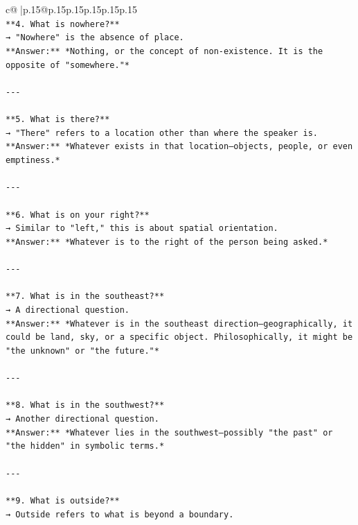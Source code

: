 \documentclass{article}
\begin{document}
{\begin{supertabular}{c@{$\;$}|p{.15\linewidth}@{}p{.15\linewidth}p{.15\linewidth}p{.15\linewidth}p{.15\linewidth}p{.15\linewidth}}
{{{\\ 
\texttt{**4. What is nowhere?**  } \\
\texttt{→ "Nowhere" is the absence of place.  } \\
\texttt{**Answer:** *Nothing, or the concept of non{-}existence. It is the opposite of "somewhere."*} \\
\\ 
\texttt{{-}{-}{-}} \\
\\ 
\texttt{**5. What is there?**  } \\
\texttt{→ "There" refers to a location other than where the speaker is.  } \\
\texttt{**Answer:** *Whatever exists in that location—objects, people, or even emptiness.*} \\
\\ 
\texttt{{-}{-}{-}} \\
\\ 
\texttt{**6. What is on your right?**  } \\
\texttt{→ Similar to "left," this is about spatial orientation.  } \\
\texttt{**Answer:** *Whatever is to the right of the person being asked.*} \\
\\ 
\texttt{{-}{-}{-}} \\
\\ 
\texttt{**7. What is in the southeast?**  } \\
\texttt{→ A directional question.  } \\
\texttt{**Answer:** *Whatever is in the southeast direction—geographically, it could be land, sky, or a specific object. Philosophically, it might be "the unknown" or "the future."*} \\
\\ 
\texttt{{-}{-}{-}} \\
\\ 
\texttt{**8. What is in the southwest?**  } \\
\texttt{→ Another directional question.  } \\
\texttt{**Answer:** *Whatever lies in the southwest—possibly "the past" or "the hidden" in symbolic terms.*} \\
\\ 
\texttt{{-}{-}{-}} \\
\\ 
\texttt{**9. What is outside?**  } \\
\texttt{→ Outside refers to what is beyond a boundary.  } \\
}}}
\end{supertabular}}
\end{document}
